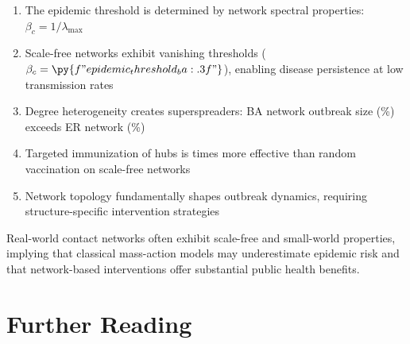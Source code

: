 \documentclass[a4paper, 11pt]{article}
\begin{document}
\begin{enumerate}
\item The epidemic threshold is determined by network spectral properties: $\beta_c = 1/\lambda_{\max}$
\item Scale-free networks exhibit vanishing thresholds ($\beta_c = \py{f"{epidemic_threshold_ba:.3f}"}$),
enabling disease persistence at low transmission rates
\item Degree heterogeneity creates superspreaders: BA network outbreak size
(\%) exceeds ER network (\%)
\item Targeted immunization of hubs is  times
more effective than random vaccination on scale-free networks
\item Network topology fundamentally shapes outbreak dynamics, requiring structure-specific
intervention strategies
\end{enumerate}

Real-world contact networks often exhibit scale-free and small-world properties, implying that
classical mass-action models may underestimate epidemic risk and that network-based interventions
offer substantial public health benefits.

\section*{Further Reading}
\end{document}
